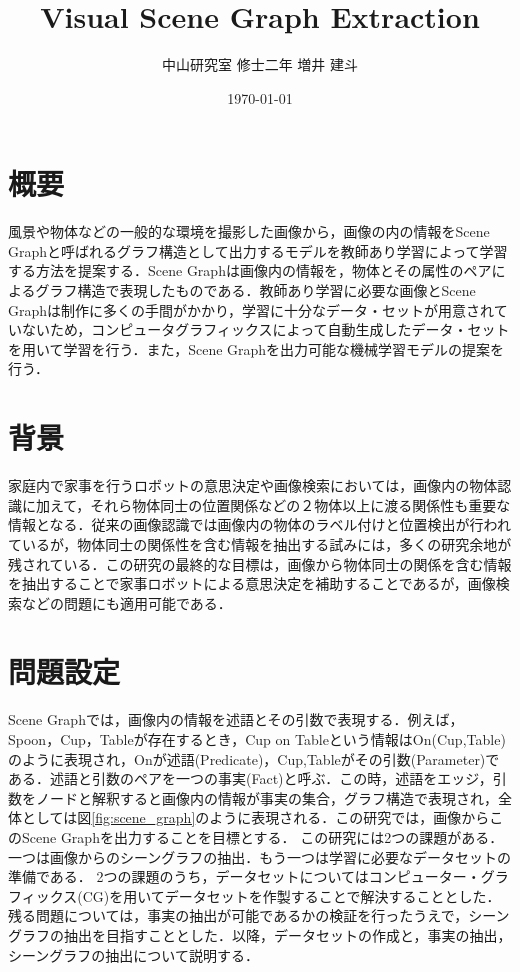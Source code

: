 

\title{Visual Scene Graph Extraction}
\author{中山研究室 修士二年 増井 建斗}
\date{\today}

\maketitle


\section{概要}
風景や物体などの一般的な環境を撮影した画像から，画像の内の情報をScene Graph\cite{scene_graph}と呼ばれるグラフ構造として出力するモデルを教師あり学習によって学習する方法を提案する．Scene Graphは画像内の情報を，物体とその属性のペアによるグラフ構造で表現したものである．教師あり学習に必要な画像とScene Graphは制作に多くの手間がかかり，学習に十分なデータ・セットが用意されていないため，コンピュータグラフィックスによって自動生成したデータ・セットを用いて学習を行う．また，Scene Graphを出力可能な機械学習モデルの提案を行う．

\section{背景}
家庭内で家事を行うロボットの意思決定や画像検索においては，画像内の物体認識に加えて，それら物体同士の位置関係などの２物体以上に渡る関係性も重要な情報となる．従来の画像認識では画像内の物体のラベル付けと位置検出が行われているが，物体同士の関係性を含む情報を抽出する試みには，多くの研究余地が残されている．この研究の最終的な目標は，画像から物体同士の関係を含む情報を抽出することで家事ロボットによる意思決定を補助することであるが，画像検索などの問題にも適用可能である．


\section{問題設定}
Scene Graphでは，画像内の情報を述語とその引数で表現する．例えば，Spoon，Cup，Tableが存在するとき，Cup on Tableという情報はOn(Cup,Table)のように表現され，Onが述語(Predicate)，Cup,Tableがその引数(Parameter)である．述語と引数のペアを一つの事実(Fact)と呼ぶ．この時，述語をエッジ，引数をノードと解釈すると画像内の情報が事実の集合，グラフ構造で表現され，全体としては図\ref{fig:scene_graph}のように表現される．この研究では，画像からこのScene Graphを出力することを目標とする．
この研究には2つの課題がある．一つは画像からのシーングラフの抽出．もう一つは学習に必要なデータセットの準備である．
2つの課題のうち，データセットについてはコンピューター・グラフィックス(CG)を用いてデータセットを作製することで解決することとした．残る問題については，事実の抽出が可能であるかの検証を行ったうえで，シーングラフの抽出を目指すこととした．以降，データセットの作成と，事実の抽出，シーングラフの抽出について説明する．


